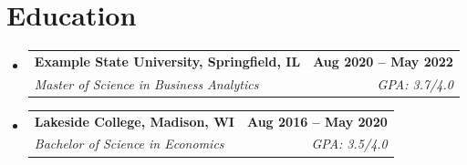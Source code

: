 \documentclass[letterpaper,11pt]{article}
\makeatletter
\newcommand{\resumeSubheading}[4]{
  \vspace{-2pt}\item
    \begin{tabular*}{1.0\textwidth}[t]{l@{\extracolsep{\fill}}r}
      \textbf{#1} & \textbf{\small #2} \\
      \textit{\small#3} & \textit{\small #4} \\
    \end{tabular*}\vspace{-9pt}
}
\newcommand{\resumeSubHeadingListStart}{\begin{itemize}[leftmargin=0.0in, label={}]}
\newcommand{\resumeSubHeadingListEnd}{\end{itemize}}
\makeatother
\begin{document}
\section{Education}
    \vspace{-3pt}
  \resumeSubHeadingListStart
    \resumeSubheading
      {Example State University, Springfield, IL}{Aug 2020 -- May 2022}
      {Master of Science in Business Analytics}{GPA: 3.7/4.0}
    \resumeSubheading
      {Lakeside College, Madison, WI}{Aug 2016 -- May 2020}
      {Bachelor of Science in Economics}{GPA: 3.5/4.0}
\resumeSubHeadingListEnd
\vspace{-10pt}
\end{document}
